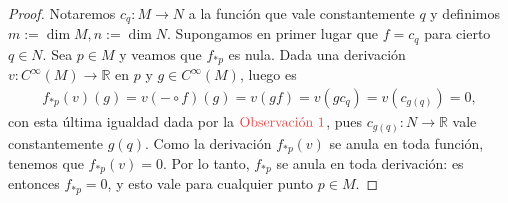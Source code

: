 \documentclass[11pt]{article}
\newcommand{\R}{\mathbb{R}}
\newcommand{\paint}[2]{\color{#1}{#2}}
\begin{document}
\begin{proof} Notaremos $c_q : M \to N$ a la funci\'on que vale constantemente $q$ y definimos $m := \dim M, n := \dim N$. Supongamos en primer lugar que $f = c_q$ para cierto $q \in N$. Sea $p \in M$ y veamos que $f_{\ast p}$ es nula. Dada una derivaci\'on $v : C^\infty(M) \to \R$ en $p$ y $g \in C^\infty(M)$, luego es
\begin{align*}
f_{\ast p}(v)(g) =  v(- \circ f)(g) = v(gf) = v(gc_q) = v(c_{g(q)}) = 0,
\end{align*}
con esta \'ultima igualdad dada por la $\paint{red}{\text{Observaci\'on $1$}}$, pues $c_{g(q)} : N \to \R$ vale constantemente $g(q)$. Como la derivaci\'on $f_{\ast p}(v)$ se anula en toda funci\'on, tenemos que $f_{\ast p}(v) = 0$. Por lo tanto, $f_{\ast p}$ se anula en toda derivaci\'on: es entonces $f_{\ast p} = 0$, y esto vale para cualquier punto $p \in M$. 


\end{proof}
\end{document}

